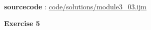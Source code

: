 \textbf{sourcecode} : \href{http://www.example.com/contents}{code/solutions/module3\_03.ijm}
\item \textbf{Exercise 5}